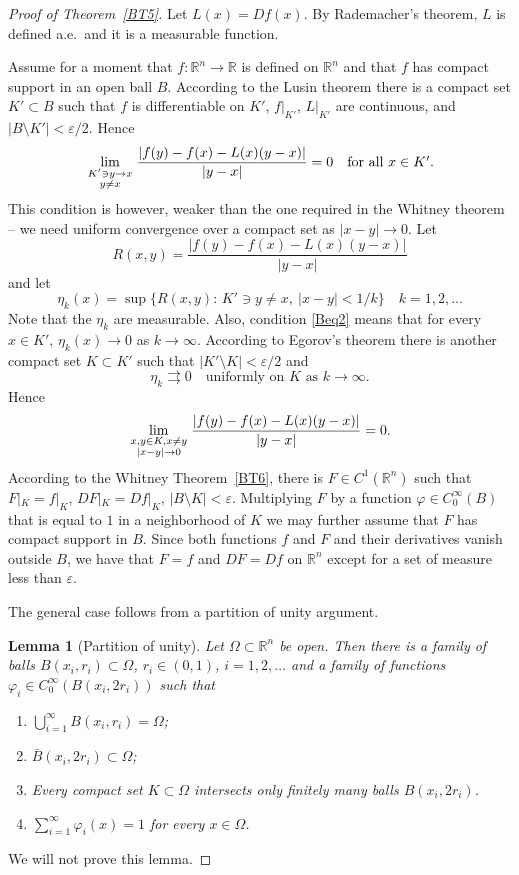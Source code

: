 \documentclass[12pt,leqno]{amsart}
\newtheorem{lemma}[theorem]{Lemma}
\theoremstyle{definition}
\newcommand{\bbbr}{\mathbb R}
\newcommand{\eps}{\varepsilon}
\numberwithin{theorem}{section} \numberwithin{equation}{section}
\begin{document}
\begin{proof}[Proof of Theorem~\ref{BT5}]
Let $L(x)=Df(x)$. By Rademacher's theorem, $L$ is defined a.e.\ and it is a measurable function.

Assume for a moment that $f:\bbbr^n\to\bbbr$ is defined on $\bbbr^n$ and that $f$ has compact support in an open ball $B$. According to the Lusin theorem there is a compact set $K'\subset B$ such that
$f$ is differentiable on $K'$,
$f|_{K'}$, $L|_{K'}$ are continuous, and $|B\setminus K'|<\eps/2$. Hence
\begin{equation}
\label{Beq2}
\lim_{{\scriptstyle K'\ni y\to x}\atop {\scriptstyle y\neq x}}
\frac{|f(y)-f(x)-L(x)(y-x)|}{|y-x|} =0
\quad
\mbox{for all $x\in K'$.}
\end{equation}
This condition is however, weaker than the one required in the Whitney theorem -- we need uniform
convergence over a compact set as $|x-y|\to 0$. Let
$$
R(x,y)=\frac{|f(y)-f(x)-L(x)(y-x)|}{|y-x|}
$$
and let
$$
\eta_k(x) = \sup\{R(x,y):\, K'\ni y\neq x,\ |x-y|<1/k\}
\quad
k=1,2,\ldots
$$
Note that the $\eta_k$ are measurable. Also, condition \eqref{Beq2} means that for every $x\in K'$,
$\eta_k(x)\to 0$ as $k\to\infty$.  According to Egorov's theorem
there is another compact set $K\subset K'$ such that $|K'\setminus K|<\eps/2$
and
$$
\eta_k\rightrightarrows 0
\quad
\text{uniformly on $K$ as $k\to\infty$.}
$$
Hence
$$
\lim_{{\scriptstyle x,y\in K, x\neq y}\atop {\scriptstyle |x-y|\to 0}}
\frac{|f(y)-f(x)-L(x)(y-x)|}{|y-x|} =0.
$$
According to the Whitney Theorem~\ref{BT6}, there is $F\in C^1(\bbbr^n)$ such that $F|_K=f|_K$,
$DF|_K=Df|_K$, $|B\setminus K|<\eps$. Multiplying $F$ by a function $\varphi\in C_0^\infty(B)$ that is equal to $1$ in a neighborhood of $K$
we may further assume that $F$ has compact support in $B$. Since both functions $f$ and  $F$ and their derivatives
vanish outside $B$, we have that $F=f$ and $DF=Df$ on $\bbbr^n$ except for a set of measure less than $\eps$.

The general case follows from a partition of unity argument.
\begin{lemma}[Partition of unity]
\label{WT1-T3}
Let $\Omega\subset\bbbr^n$ be open. Then there is a family of balls $B(x_i,r_i)\subset\Omega$, $r_i\in (0,1)$,
$i=1,2,\ldots$ and a family of functions $\varphi_i\in C_0^\infty(B(x_i,2r_i))$ such that
\begin{enumerate}
\item
$\bigcup_{i=1}^\infty B(x_i,r_i)=\Omega$;
\item
$\bar{B}(x_i,2r_i)\subset\Omega$;
\item
Every compact set $K\subset\Omega$ intersects only finitely many balls $B(x_i,2r_i)$.
\item
$
\sum_{i=1}^\infty \varphi_i(x)=1
$
for every $x\in\Omega$.
\end{enumerate}
\end{lemma}
We will not prove this lemma.


\end{proof}
\end{document}
